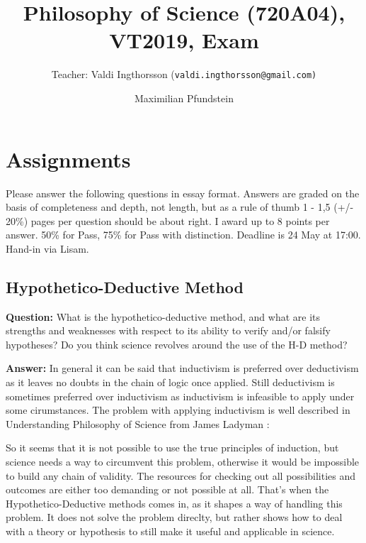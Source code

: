\documentclass[11pt]{scrartcl}
\title{Philosophy of Science (720A04), VT2019, Exam}
\subtitle{Teacher: Valdi Ingthorsson (\texttt{valdi.ingthorsson@gmail.com)}}
\author{Maximilian Pfundstein}
\begin{document}
\maketitle

\tableofcontents

\newpage

\section{Assignments}

Please answer the following questions in essay format. Answers are graded on the basis of completeness and depth, not length, but as a rule of thumb 1 - 1,5 (+/- 20\%) pages per question should be about right. I award up to 8 points per answer. 50\% for Pass, 75\% for Pass with distinction. Deadline is 24 May at 17:00. Hand-in via Lisam.

\subsection{Hypothetico-Deductive Method}

\textbf{Question:} What is the hypothetico-deductive method, and what are its strengths and weaknesses with respect to its ability to verify and/or falsify hypotheses? Do you think science revolves around the use of the H-D method?

\bigbreak

\textbf{Answer:} In general it can be said that inductivism is preferred over deductivism as it leaves no doubts in the chain of logic once applied. Still deductivism is sometimes preferred over inductivism as inductivism is infeasible to apply under some cirumstances. The problem with applying inductivism is well described in Understanding Philosophy of Science from James Ladyman \cite[p. 40]{ladyman}: 

So it seems that it is not possible to use the true principles of induction, but science needs a way to circumvent this problem, otherwise it would be impossible to build any chain of validity. The resources for checking out all possibilities and outcomes are either too demanding or not possible at all. That's when the Hypothetico-Deductive methods comes in, as it shapes a way of handling this problem. It does not solve the problem direclty, but rather shows how to deal with a theory or hypothesis to still make it useful and applicable in science.
\end{document}

